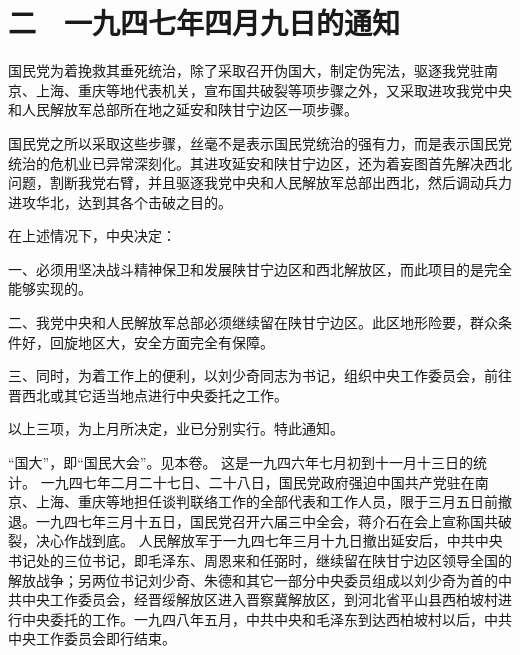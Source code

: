 \section{二　一九四七年四月九日的通知}

国民党为着挽救其垂死统治，除了采取召开伪国大，制定伪宪法，驱逐我党驻南京、上海、重庆等地代表机关，宣布国共破裂等项步骤之外，又采取进攻我党中央和人民解放军总部所在地之延安和陕甘宁边区一项步骤。

国民党之所以采取这些步骤，丝毫不是表示国民党统治的强有力，而是表示国民党统治的危机业已异常深刻化。其进攻延安和陕甘宁边区，还为着妄图首先解决西北问题，割断我党右臂，并且驱逐我党中央和人民解放军总部出西北，然后调动兵力进攻华北，达到其各个击破之目的。

在上述情况下，中央决定：

一、必须用坚决战斗精神保卫和发展陕甘宁边区和西北解放区，而此项目的是完全能够实现的。

二、我党中央和人民解放军总部必须继续留在陕甘宁边区。此区地形险要，群众条件好，回旋地区大，安全方面完全有保障。

三、同时，为着工作上的便利，以刘少奇同志为书记，组织中央工作委员会，前往晋西北或其它适当地点进行中央委托之工作。

以上三项，为上月所决定，业已分别实行。特此通知。


\begin{maonote}
“国大”，即“国民大会”。见本卷。
这是一九四六年七月初到十一月十三日的统计。
一九四七年二月二十七日、二十八日，国民党政府强迫中国共产党驻在南京、上海、重庆等地担任谈判联络工作的全部代表和工作人员，限于三月五日前撤退。一九四七年三月十五日，国民党召开六届三中全会，蒋介石在会上宣称国共破裂，决心作战到底。
人民解放军于一九四七年三月十九日撤出延安后，中共中央书记处的三位书记，即毛泽东、周恩来和任弼时，继续留在陕甘宁边区领导全国的解放战争；另两位书记刘少奇、朱德和其它一部分中央委员组成以刘少奇为首的中共中央工作委员会，经晋绥解放区进入晋察冀解放区，到河北省平山县西柏坡村进行中央委托的工作。一九四八年五月，中共中央和毛泽东到达西柏坡村以后，中共中央工作委员会即行结束。
\end{maonote}
